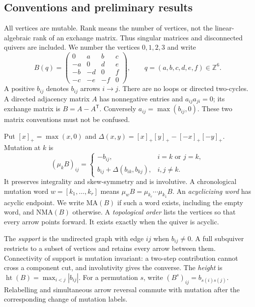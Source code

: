 \documentclass[11pt]{amsart}
\theoremstyle{definition}\newtheorem{definition}[theorem]{Definition}
\theoremstyle{remark}\newtheorem{remark}[theorem]{Remark}
\newcommand{\Z}{\mathbb Z}\newcommand{\N}{\mathbb N}
\newcommand{\MA}{\mathrm{MA}}\newcommand{\NMA}{\mathrm{NMA}}
\newcommand{\htq}{\operatorname{ht}}\newcommand{\Pf}{\operatorname{Pf}}
\begin{document}
\subsection{Conventions and preliminary results}
All vertices are mutable. Rank means the number of vertices, not the linear-algebraic rank of an exchange matrix. Thus singular matrices and disconnected quivers are included. We number the vertices $0,1,2,3$ and write
\begin{equation}\label{eq:matrix}
 B(q)=\begin{pmatrix}0&a&b&c\\-a&0&d&e\\-b&-d&0&f\\-c&-e&-f&0\end{pmatrix},
 \qquad q=(a,b,c,d,e,f)\in\Z^6.
\end{equation}
A positive $b_{ij}$ denotes $b_{ij}$ arrows $i\to j$. There are no loops or directed two-cycles. A directed adjacency matrix $A$ has nonnegative entries and $a_{ij}a_{ji}=0$; its exchange matrix is $B=A-A^{\mathsf T}$. Conversely $a_{ij}=\max(b_{ij},0)$. These two matrix conventions must not be confused.

Put $[x]_+=\max(x,0)$ and $\Delta(x,y)=[x]_+[y]_+-[-x]_+[-y]_+$. Mutation at $k$ is \cite{FZ}
\begin{equation}\label{eq:mutation}
 (\mu_kB)_{ij}=\begin{cases}-b_{ij},&i=k\text{ or }j=k,\\
 b_{ij}+\Delta(b_{ik},b_{kj}),&i,j\ne k.
 \end{cases}
\end{equation}
It preserves integrality and skew-symmetry and is involutive. A chronological mutation word $w=[k_1,\ldots,k_r]$ means $\mu_wB=\mu_{k_r}\cdots\mu_{k_1}B$. An \emph{acyclicizing word} has acyclic endpoint. We write $\MA(B)$ if such a word exists, including the empty word, and $\NMA(B)$ otherwise. A \emph{topological order} lists the vertices so that every arrow points forward. It exists exactly when the quiver is acyclic.

The \emph{support} is the undirected graph with edge $ij$ when $b_{ij}\ne0$. A full subquiver restricts to a subset of vertices and retains every arrow between them. Connectivity of support is mutation invariant: a two-step contribution cannot cross a component cut, and involutivity gives the converse. The \emph{height} is $\htq(B)=\max_{i<j}|b_{ij}|$. For a permutation $s$, write $(B^s)_{ij}=b_{s(i)s(j)}$. Relabelling and simultaneous arrow reversal commute with mutation after the corresponding change of mutation labels.
\end{document}
